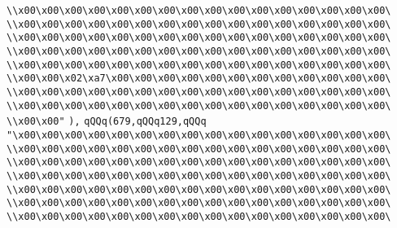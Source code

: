 \verb|\\x00\x00\x00\x00\x00\x00\x00\x00\x00\x00\x00\x00\x00\x00\x00\x00\|\newline
\verb|\\x00\x00\x00\x00\x00\x00\x00\x00\x00\x00\x00\x00\x00\x00\x00\x00\|\newline
\verb|\\x00\x00\x00\x00\x00\x00\x00\x00\x00\x00\x00\x00\x00\x00\x00\x00\|\newline
\verb|\\x00\x00\x00\x00\x00\x00\x00\x00\x00\x00\x00\x00\x00\x00\x00\x00\|\newline
\verb|\\x00\x00\x00\x00\x00\x00\x00\x00\x00\x00\x00\x00\x00\x00\x00\x00\|\newline
\verb|\\x00\x00\x02\xa7\x00\x00\x00\x00\x00\x00\x00\x00\x00\x00\x00\x00\|\newline
\verb|\\x00\x00\x00\x00\x00\x00\x00\x00\x00\x00\x00\x00\x00\x00\x00\x00\|\newline
\verb|\\x00\x00\x00\x00\x00\x00\x00\x00\x00\x00\x00\x00\x00\x00\x00\x00\|\newline
\verb|\\x00\x00"|\newline
\verb|),|\newline
\verb|qQQq(679,qQQq129,qQQq|\newline
\verb|"\x00\x00\x00\x00\x00\x00\x00\x00\x00\x00\x00\x00\x00\x00\x00\x00\|\newline
\verb|\\x00\x00\x00\x00\x00\x00\x00\x00\x00\x00\x00\x00\x00\x00\x00\x00\|\newline
\verb|\\x00\x00\x00\x00\x00\x00\x00\x00\x00\x00\x00\x00\x00\x00\x00\x00\|\newline
\verb|\\x00\x00\x00\x00\x00\x00\x00\x00\x00\x00\x00\x00\x00\x00\x00\x00\|\newline
\verb|\\x00\x00\x00\x00\x00\x00\x00\x00\x00\x00\x00\x00\x00\x00\x00\x00\|\newline
\verb|\\x00\x00\x00\x00\x00\x00\x00\x00\x00\x00\x00\x00\x00\x00\x00\x00\|\newline
\verb|\\x00\x00\x00\x00\x00\x00\x00\x00\x00\x00\x00\x00\x00\x00\x00\x00\|\newline
